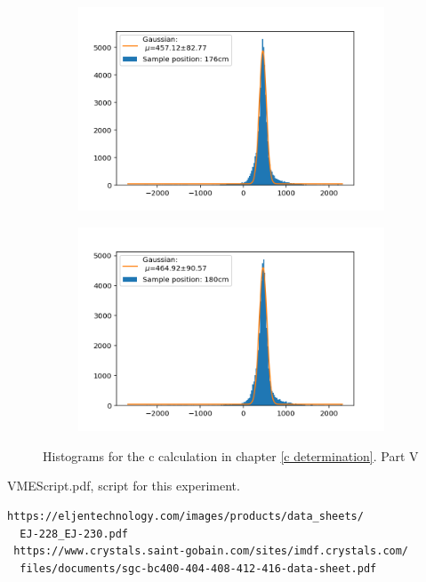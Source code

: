 \documentclass[]{article}
\begin{document}
\begin{figure}[H]
\medskip
\begin{subfigure}{0.48\textwidth}
\includegraphics[width=\linewidth]{Plots/Pos/176cm.png}
\end{subfigure}
\begin{subfigure}[c]{0.48\linewidth}
\includegraphics[width=\linewidth]{Plots/Pos/180cm.png}
\end{subfigure}
\caption{Histograms for the c calculation in chapter \ref{c determination}. Part V }
\end{figure}


\newpage
\begin{thebibliography}{}

 VMEScript.pdf, script for this experiment.

 \begin{verbatim}
https://eljentechnology.com/images/products/data_sheets/
  EJ-228_EJ-230.pdf
 https://www.crystals.saint-gobain.com/sites/imdf.crystals.com/
  files/documents/sgc-bc400-404-408-412-416-data-sheet.pdf
\end{verbatim} 


\end{thebibliography}
\end{document}
